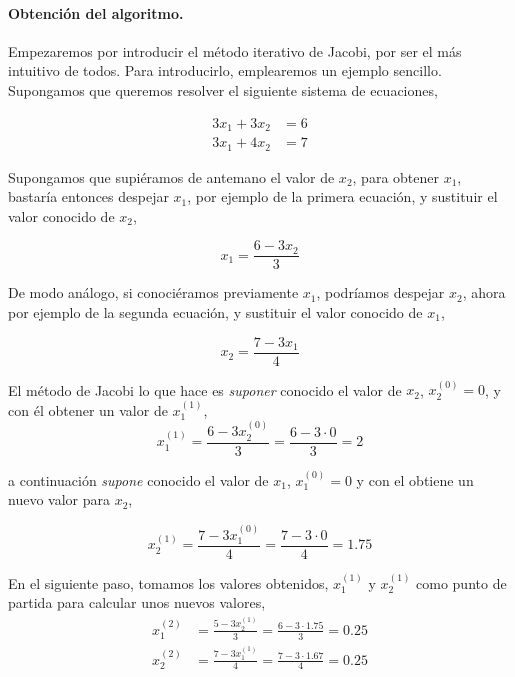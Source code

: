 \paragraph{Obtención del algoritmo.}Empezaremos por introducir el método iterativo de Jacobi, por ser el más intuitivo de todos. Para introducirlo, emplearemos un ejemplo sencillo. Supongamos que queremos resolver el siguiente sistema de ecuaciones,

\begin{align*}
3x_1+3x_2&=6\\
3x_1+4x_2&=7
\end{align*}

Supongamos que supiéramos de antemano el valor de $x_2$, para obtener $x_1$, bastaría entonces despejar $x_1$, por ejemplo de la primera ecuación, y sustituir el valor conocido de $x_2$,

\begin{equation*}
x_1=\frac{6-3x_2}{3}
\end{equation*}

De modo análogo, si conociéramos previamente $x_1$, podríamos despejar $x_2$, ahora por ejemplo de la segunda ecuación, y sustituir el valor conocido de $x_1$,

\begin{equation*}
x_2=\frac{7-3x_1}{4}
\end{equation*}

El método de Jacobi lo que hace es \emph{suponer} conocido el valor de $x_2$, $x_2^{(0)}=0$, y con él obtener un valor de $x_1^{(1)}$,
\begin{equation*}
x_1^{(1)}=\frac{6-3x_2^{(0)}}{3}=\frac{6-3\cdot 0}{3}=2
\end{equation*}

a continuación \emph{supone} conocido el valor de $x_1$, $x_1^{(0)}=0$ y con el obtiene un nuevo valor para $x_2$,

\begin{equation*}
x_2^{(1)}=\frac{7-3x_1^{(0)}}{4}=\frac{7-3\cdot 0}{4}=1.75
\end{equation*}

En el siguiente paso, tomamos los valores obtenidos, $x_1^{(1)}$ y $x_2^{(1)}$ como punto de partida para calcular unos nuevos valores,
\begin{align*}
x_1^{(2)}&=\frac{5-3x_2^{(1)}}{3}=\frac{6-3\cdot 1.75}{3}=0.25\\
x_2^{(2)}&=\frac{7-3x_1^{(1)}}{4}=\frac{7-3\cdot 1.67}{4}=0.25
\end{align*}

